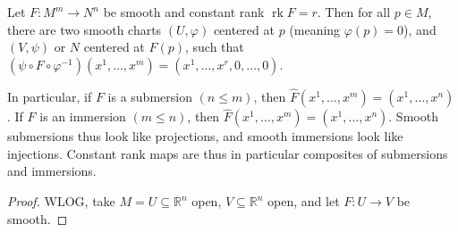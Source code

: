 \begin{theorem}[Rank]\label{1.2.32}
	Let $F : M^m \to N^n$ be smooth and constant rank $\operatorname{rk} F=r$. Then for all $p\in M$, there are two smooth charts $(U,\varphi )$ centered at $p$ (meaning $\varphi (p)=0$), and $(V,\psi )$ or $N$ centered at $F(p)$, such that $(\psi \circ F\circ \varphi ^{-1} )(x^1, \ldots ,x^m)=(x^1, \ldots ,x^r, 0,\ldots ,0)$.

	In particular, if $F$ is a submersion $(n\leq m)$, then $\hat{F} (x^1, \ldots ,x^m)=(x^1, \ldots ,x^n)$. If $F$ is an immersion $(m\leq n)$, then $\hat{F} (x^1, \ldots ,x^m)=(x^1, \ldots ,x^n)$. Smooth submersions thus look like projections, and smooth immersions look like injections. Constant rank maps are thus in particular composites of submersions and immersions.
\end{theorem}
\begin{proof}
	WLOG, take $M=U \subseteq \mathbb{R} ^n$ open, $V\subseteq \mathbb{R} ^n$ open, and let $F : U \to V$ be smooth. 
\end{proof}

